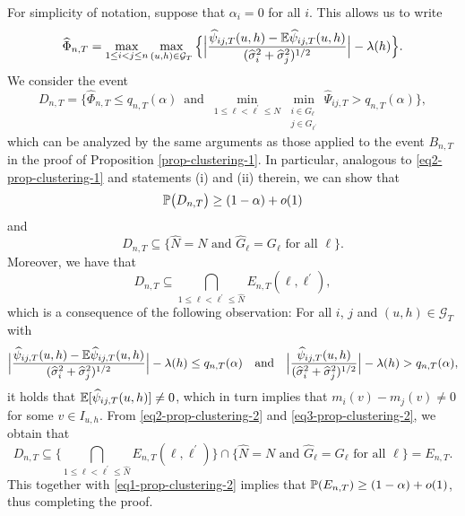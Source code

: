 \documentclass[a4paper,12pt]{article}
\begin{document}
For simplicity of notation, suppose that $\alpha_i = 0$ for all $i$. This allows us to write 
\[ \widehat{\Phi}_{n,T} = \max_{1 \le i < j \le n} \max_{(u,h) \in \mathcal{G}_T} \Big\{ \Big| \frac{\widehat{\psi}_{ij,T}(u,h)- \mathbb{E} \widehat{\psi}_{ij,T}(u,h)} {(\widehat{\sigma}_i^2 + \widehat{\sigma}_j^2)^{1/2}} \Big| - \lambda(h) \Big \}. \]
We consider the event
\[ D_{n,T} = \Big\{ \widehat{\Phi}_{n,T} \le q_{n,T}(\alpha) \, \text{ and } \,  \min_{1 \le \ell < \ell^\prime \le N} \min_{\substack{i \in G_\ell \\ j \in G_{\ell^\prime}}} \widehat{\Psi}_{ij,T} > q_{n,T}(\alpha) \Big\}, \]
which can be analyzed by the same arguments as those applied to the event $B_{n,T}$ in the proof of Proposition \ref{prop-clustering-1}. In particular, analogous to \eqref{eq2-prop-clustering-1} and statements (i) and (ii) therein, we can show that 
\begin{equation}\label{eq1-prop-clustering-2}
\mathbb{P} \big( D_{n,T} \big) \ge (1-\alpha) + o(1)
\end{equation}
and 
\begin{equation}\label{eq2-prop-clustering-2}
D_{n,T} \subseteq \big\{ \widehat{N} = N \text{ and } \widehat{G}_\ell = G_\ell \text{ for all } \ell \big\}.
\end{equation}
Moreover, we have that
\begin{equation}\label{eq3-prop-clustering-2}
D_{n,T} \subseteq \bigcap_{1 \le \ell < \ell^\prime \le \widehat{N}} E_{n,T}(\ell,\ell^\prime),
\end{equation}
which is a consequence of the following observation: For all $i$, $j$ and $(u,h) \in \mathcal{G}_T$ with 
\[ \Big|\frac{\widehat{\psi}_{ij,T}(u,h) - \mathbb{E} \widehat{\psi}_{ij,T}(u,h)}{(\widehat{\sigma}_i^2 + \widehat{\sigma}_j^2)^{1/2}}\Big| - \lambda(h) \le q_{n,T}(\alpha) \quad \text{and} \quad \Big|\frac{\widehat{\psi}_{ij,T}(u,h)}{(\widehat{\sigma}_i^2 + \widehat{\sigma}_j^2)^{1/2}}\Big| - \lambda(h) > q_{n,T}(\alpha), \]
it holds that $\mathbb{E}[\widehat{\psi}_{ij,T}(u,h)] \ne 0$, which in turn implies that $m_i(v) - m_j(v) \ne 0$ for some $v \in I_{u,h}$. From \eqref{eq2-prop-clustering-2} and \eqref{eq3-prop-clustering-2}, we obtain that 
\[ D_{n,T} \subseteq \Big\{ \bigcap_{1 \le \ell < \ell^\prime \le \widehat{N}} E_{n,T}(\ell,\ell^\prime) \Big\} \cap \big\{ \widehat{N} = N \text{ and } \widehat{G}_\ell = G_\ell \text{ for all } \ell \big\} = E_{n,T}. \] 
This together with \eqref{eq1-prop-clustering-2} implies that $\mathbb{P}(E_{n,T}) \ge (1-\alpha) + o(1)$, thus completing the proof. 
\end{document}
